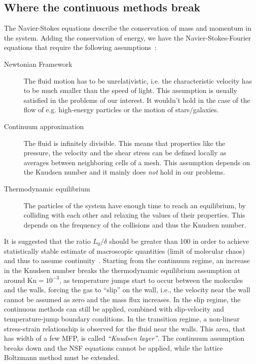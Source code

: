 \subsection{Where the continuous methods break}
The Navier-Stokes equations describe the conservation of mass and momentum in
the system. Adding the conservation of energy, we have the Navier-Stokes-Fourier
equations that require the following assumptions~\cite{Barber2006}:
\begin{description}
 \item[Newtonian Framework] The fluid motion has to be unrelativistic, i.e. 
 the characteristic velocity has to be much smaller than the speed of light.
 This assumption is usually satisfied in the problems of our interest.
 It wouldn't hold in the case of the flow of e.g. high-energy particles
 or the motion of stars/galaxies.
 \item[Continuum approximation] The fluid is infinitely divisible. This means that
 properties like the pressure, the velocity and the shear stress can be defined locally as averages between
 neighboring cells of a mesh. This assumption depends on the Knudsen number and it mainly does \textit{not} hold in our problems.
 \item[Thermodynamic equilibrium] The particles of the system have enough time to reach
 an equilibrium, by colliding with each other and relaxing the values of their properties.
 This depends on the frequency of the collisions and thus the Knudsen number.
\end{description}

It is suggested that the ratio $L_0/\delta$ should be greater than 100 in order
to achieve statistically stable estimate of macroscopic quantities
(limit of molecular chaos) and thus to assume continuity~\cite{Barber2006}.
Starting from the continuum regime, an increase in the Knudsen number breaks
the thermodynamic equilibrium assumption at around $\mathrm{Kn}=10^{-3}$,
as temperature jumps start to occur between the molecules and the walls,
forcing the gas to ``slip'' on the wall, i.e., the velocity near the wall cannot
be assumed as zero and the mass flux increases.
In the slip regime, the continuous methods can still be applied, combined with slip-velocity
and temperature-jump boundary conditions. In the transition regime,
a non-linear stress-strain relationship is observed for the fluid near the walls.
This area, that has width of a few MFP, is called \textit{``Knudsen layer''}. The 
continuum assumption breaks down and the NSF equations cannot be applied, while
the lattice Boltzmann method must be extended.
